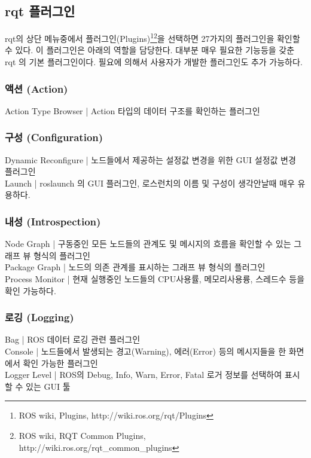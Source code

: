 \subsection{rqt 플러그인}

rqt의 상단 메뉴중에서 플러그인(Plugins)\footnote{ROS wiki, Plugins, http://wiki.ros.org/rqt/Plugins}\footnote{ROS wiki, RQT Common Plugins, http://wiki.ros.org/rqt\_common\_plugins}을 선택하면 27가지의 플러그인을 확인할 수 있다. 이 플러그인은 아래의 역할을 담당한다. 대부분 매우 필요한 기능등을 갖춘 rqt 의 기본 플러그인이다. 필요에 의해서 사용자가 개발한 플러그인도 추가 가능하다.

\subsubsection{액션 (Action)}
Action Type Browser | Action 타입의 데이터 구조를 확인하는 플러그인 
\subsubsection{구성 (Configuration)}
Dynamic Reconfigure | 노드들에서 제공하는 설정값 변경을 위한 GUI 설정값 변경 플러그인\\
Launch | roslaunch 의 GUI 플러그인, 로스런치의 이름 및 구성이 생각안날때 매우 유용하다.\\
\subsubsection{내성 (Introspection)}
Node Graph | 구동중인 모든 노드들의 관계도 및 메시지의 흐름을 확인할 수 있는 그래프 뷰 형식의 플러그인\\
Package Graph | 노드의 의존 관계를 표시하는 그래프 뷰 형식의 플러그인\\
Process Monitor | 현재 실행중인 노드들의 CPU사용률, 메모리사용륭, 스레드수 등을 확인 가능하다.\\
\subsubsection{로깅 (Logging)}
Bag | ROS 데이터 로깅 관련 플러그인\\
Console | 노드들에서 발생되는 경고(Warning), 에러(Error) 등의 메시지들을 한 화면에서 확인 가능한 플러그인\\
Logger Level | ROS의 Debug, Info, Warn, Error, Fatal 로거 정보를 선택하여 표시할 수 있는 GUI 툴\\
